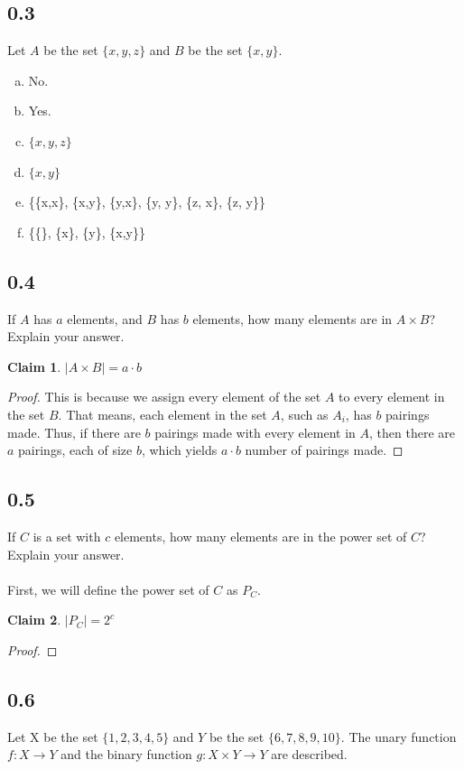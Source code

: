 \documentclass[11pt]{article}
\newtheorem*{claim*}{Claim}
\begin{document}
\subsection*{0.3}
Let $A$ be the set $\{x, y, z\}$ and $B$ be the set $\{x, y\}$.

\begin{enumerate}[a.]
\item No.
\item Yes.
\item $\{x, y, z\}$
\item $\{x, y\}$
\item \{\{x,x\}, \{x,y\}, \{y,x\}, \{y, y\}, \{z, x\}, \{z, y\}\}
\item \{\{\}, \{x\}, \{y\}, \{x,y\}\}
\end{enumerate}

\subsection*{0.4}
If $A$ has $a$ elements, and $B$ has $b$ elements, how many elements are in $A \times B$? Explain your answer.\\
\begin{claim*}
$|A \times B| = a \cdot b$ 
\end{claim*}
\begin{proof}
This is because we assign every element of the set $A$ to every element in the set $B$. That means, each element in the set $A$, such as $A_i$, has $b$ pairings made. Thus, if there are $b$ pairings made with every element in $A$, then there are $a$ pairings, each of size $b$, which yields $a \cdot b$ number of pairings made. 
\end{proof}

\subsection*{0.5}
If $C$ is a set with $c$ elements, how many elements are in the power set of $C$? Explain your answer.\\
\\
First, we will define the power set of $C$ as $P_C$. 
\begin{claim*}
$|P_C| = 2^{c}$
\end{claim*}
\begin{proof}

\end{proof}

\subsection*{0.6}
Let X be the set $\{1, 2, 3, 4, 5\}$ and $Y$ be the set $\{6, 7, 8, 9, 10\}$. The unary function $f: X \rightarrow Y$ and the binary function $g: X \times Y \rightarrow Y$ are described.
\end{document}
